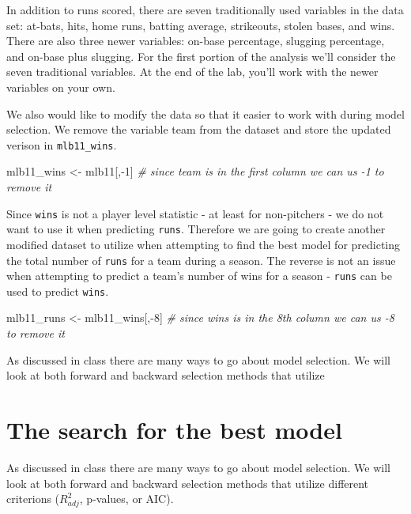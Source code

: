 \documentclass[]{book}
\newenvironment{Shaded}{\begin{snugshade}}{\end{snugshade}}
\newcommand{\DecValTok}[1]{\textcolor[rgb]{0.00,0.00,0.81}{{#1}}}
\newcommand{\StringTok}[1]{\textcolor[rgb]{0.31,0.60,0.02}{{#1}}}
\newcommand{\CommentTok}[1]{\textcolor[rgb]{0.56,0.35,0.01}{\textit{{#1}}}}
\newcommand{\NormalTok}[1]{{#1}}
\theoremstyle{definition}
\theoremstyle{definition}
\theoremstyle{definition}
\theoremstyle{remark}
\begin{document}
In addition to runs scored, there are seven traditionally used variables
in the data set: at-bats, hits, home runs, batting average, strikeouts,
stolen bases, and wins. There are also three newer variables: on-base
percentage, slugging percentage, and on-base plus slugging. For the
first portion of the analysis we'll consider the seven traditional
variables. At the end of the lab, you'll work with the newer variables
on your own.

We also would like to modify the data so that it easier to work with
during model selection. We remove the variable team from the dataset and
store the updated verison in \texttt{mlb11\_wins}.

\begin{Shaded}
\begin{Highlighting}[]
\NormalTok{mlb11_wins <-}\StringTok{ }\NormalTok{mlb11[,-}\DecValTok{1}\NormalTok{] }\CommentTok{# since team is in the first column we can us -1 to remove it}
\end{Highlighting}
\end{Shaded}

Since \texttt{wins} is not a player level statistic - at least for
non-pitchers - we do not want to use it when predicting \texttt{runs}.
Therefore we are going to create another modified dataset to utilize
when attempting to find the best model for predicting the total number
of \texttt{runs} for a team during a season. The reverse is not an issue
when attempting to predict a team's number of wins for a season -
\texttt{runs} can be used to predict \texttt{wins}.

\begin{Shaded}
\begin{Highlighting}[]
\NormalTok{mlb11_runs <-}\StringTok{ }\NormalTok{mlb11_wins[,-}\DecValTok{8}\NormalTok{] }\CommentTok{# since wins is in the 8th column we can us -8 to remove it}
\end{Highlighting}
\end{Shaded}

As discussed in class there are many ways to go about model selection.
We will look at both forward and backward selection methods that utilize

\section{The search for the best
model}\label{the-search-for-the-best-model}

As discussed in class there are many ways to go about model selection.
We will look at both forward and backward selection methods that utilize
different criterions (\(R^2_{adj}\), p-values, or AIC).
\end{document}
